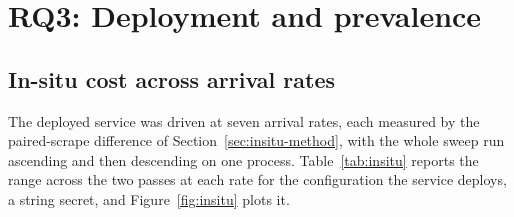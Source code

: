 \documentclass[pdflatex,sn-basic,twocolumn]{sn-jnl}%
\begin{document}
\section{RQ3: Deployment and prevalence}\label{sec:rq3}

\subsection{In-situ cost across arrival rates}\label{sec:insitu}

The deployed service was driven at seven arrival rates, each measured by the
paired-scrape difference of Section~\ref{sec:insitu-method}, with the whole sweep
run ascending and then descending on one process. Table~\ref{tab:insitu} reports
the range across the two passes at each rate for the configuration the service
deploys, a string secret, and Figure~\ref{fig:insitu} plots it.
\end{document}
